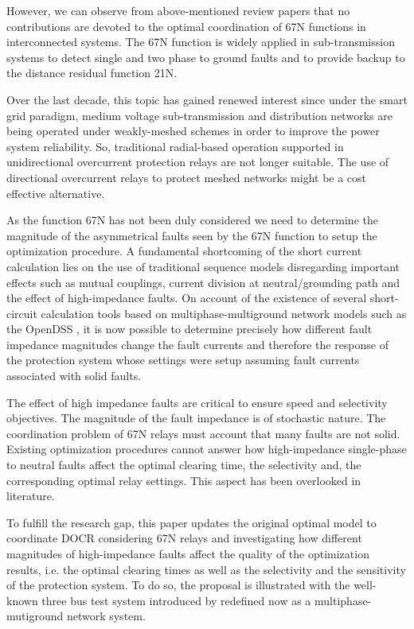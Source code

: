 \documentclass[letterpaper, 10 pt, conference]{IEEEtran}
\begin{document}
However, we can observe from above-mentioned review papers that no contributions are devoted to the optimal coordination of 67N functions in interconnected systems. The 67N function  is widely applied in sub-transmission systems to detect single and two phase to ground faults and to provide backup to the distance residual function 21N.

Over the last decade, this topic has gained renewed interest since under the smart grid paradigm, medium voltage sub-transmission and distribution networks are being operated under weakly-meshed schemes in order to improve the power system reliability. So, traditional radial-based operation supported in unidirectional overcurrent protection relays are not longer suitable. The use of directional overcurrent relays to protect meshed networks might be a cost effective alternative.

As the function 67N has not been duly considered  we need to determine the magnitude of the asymmetrical faults seen by the 67N function to setup the optimization procedure. A fundamental shortcoming of the short current calculation lies on the use of traditional sequence models disregarding important effects such as mutual couplings, current division at neutral/grounding path and the effect of high-impedance faults. On account of the existence of several short-circuit calculation tools based on multiphase-multiground network models such as the OpenDSS \cite{opendss}, it is now possible to determine precisely how different fault impedance magnitudes change the fault currents and therefore the response of the protection system whose settings were setup assuming fault currents associated with solid faults.

The effect of high impedance faults are critical to ensure speed and selectivity objectives. The magnitude of the fault impedance is of stochastic nature. The coordination problem of 67N relays must account that many faults are not solid. Existing optimization procedures cannot answer how high-impedance single-phase to neutral faults affect the optimal clearing time, the selectivity and, the corresponding optimal relay settings. This aspect has been overlooked in literature.

To fulfill the research gap, this paper updates the original optimal model to coordinate DOCR \cite{urdaneta1988} considering  67N relays and investigating how different magnitudes of high-impedance faults affect the quality of the optimization results, i.e. the optimal clearing times as well as the selectivity and the sensitivity of the protection system. To do so, the proposal is illustrated with the well-known three bus test system introduced by \cite{urdaneta1988} redefined now as a multiphase-mutiground network system.
\end{document}
